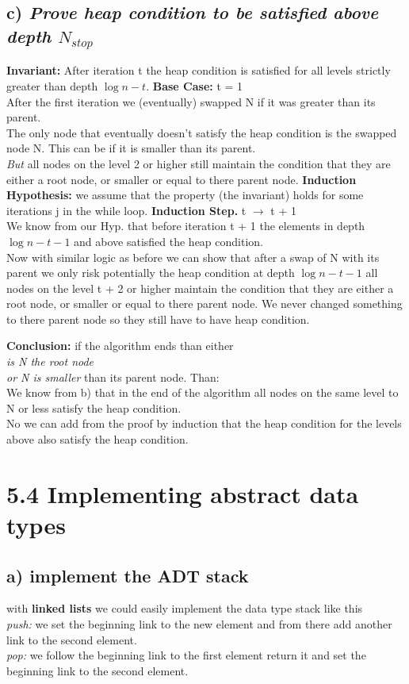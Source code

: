 \documentclass[12pt,letterpaper]{article}
\begin{document}
\newpage
\subsection{c) \textit{Prove heap condition to be satisfied above depth $N_{stop}$}}
\textbf{Invariant: } After iteration t the heap condition is satisfied for all levels strictly greater than depth $\log{n} - t$.\bigbreak
\textbf{Base Case: } t = 1\\
After the first iteration we (eventually) swapped N if it was greater than its parent.\\
The only node that eventually doesn't satisfy the heap condition is the swapped node N. This can be if it is smaller than its parent.\\
\textit{But} all nodes on the level 2 or higher still maintain the condition that they are either a root node, or smaller or equal to there parent node.\bigbreak
\textbf{Induction Hypothesis: } we assume that the property (the invariant) holds for some iterations j in the while loop.\bigbreak
\textbf{Induction Step. } t $\to$ t + 1\\
We know from our Hyp. that before iteration t + 1 the elements in depth $\log{n} - t - 1$ and above satisfied the heap condition.\\
Now with similar logic as before we can show that after a swap of N with its parent we only risk potentially the heap condition at depth $\log{n} - t -1 $\bigbreak
all nodes on the level t + 2 or higher maintain the condition that they are either a root node, or smaller or equal to there parent node. We never changed something to there parent node so they still have to have heap condition.\bigbreak

\textbf{Conclusion: } if the algorithm ends than either\\
\textit{is N the root node}\\
\textit{or N is smaller} than its parent node. Than:\\ 
We know from b) that in the end of the algorithm all nodes on the same level to N or less satisfy the heap condition.\\
No we can add from the proof by induction that the heap condition for the levels above also satisfy the heap condition.

\newpage
\section{5.4 Implementing abstract data types}

\subsection{a) implement the ADT stack}
with \textbf{linked lists} we could easily implement the data type stack like this\\
\textit{push:} we set the beginning link to the new element and from there add another link to the second element.\\
\textit{pop:} we follow the beginning link to the first element return it and set the beginning link to the second element.
\end{document}
